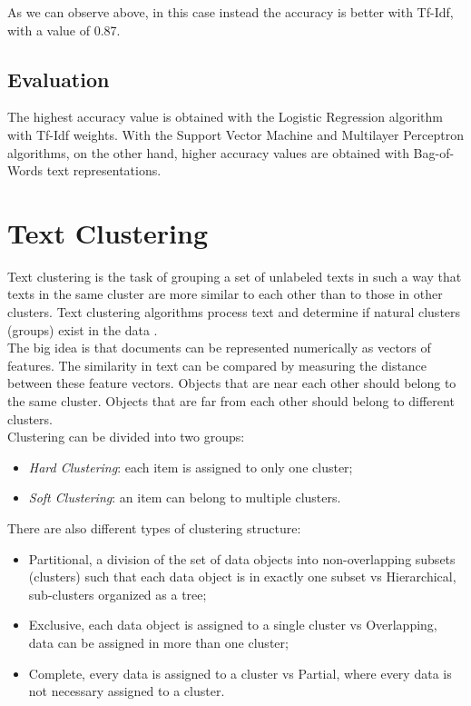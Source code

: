 \documentclass[fleqn,10pt]{SelfArx} %
\begin{document}
As we can observe above, in this case instead the accuracy is better with Tf-Idf, with a value of 0.87.

\subsection{Evaluation}
The highest accuracy value is obtained with the Logistic Regression algorithm with Tf-Idf weights. With the Support Vector Machine and Multilayer Perceptron algorithms, on the other hand, higher accuracy values are obtained with Bag-of-Words text representations.

\section{Text Clustering}
Text clustering is the task of grouping a set of unlabeled texts in such a way that texts in the same cluster are more similar to each other than to those in other clusters. Text clustering algorithms process text and determine if natural clusters (groups) exist in the data \cite{textClustering}.\\
The big idea is that documents can be represented numerically as vectors of features. The similarity in text can be compared by measuring the distance between these feature vectors. Objects that are near each other should belong to the same cluster. Objects that are far from each other should belong to different clusters.\\
Clustering can be divided into two groups:
\begin{itemize}
	\item \textit{Hard Clustering}: each item is assigned to only one cluster;
	\item \textit{Soft Clustering}: an item can belong to multiple clusters.
\end{itemize}

There are also different types of clustering structure:
\begin{itemize}
	\item Partitional, a division of the set of data objects into non-overlapping subsets (clusters) such that each data object is in exactly one subset vs Hierarchical, sub-clusters organized as a tree;
	\item Exclusive, each data object is assigned to a single cluster vs Overlapping, data can be assigned in more than one cluster;
	\item Complete, every data is assigned to a cluster vs Partial, where every data is not necessary assigned to a cluster.
\end{itemize}
\end{document}
